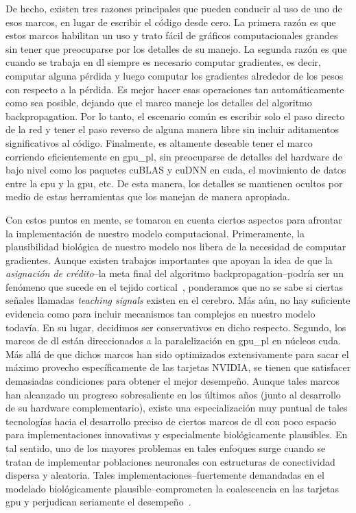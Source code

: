 {De hecho, existen tres razones principales que pueden conducir al uso de uno de esos marcos, en lugar de escribir el código desde cero.
La primera razón es que estos marcos habilitan un uso y trato fácil de gráficos computacionales grandes sin tener que preocuparse por los detalles de su manejo.
La segunda razón es que cuando se trabaja en \gls{dl} siempre es necesario computar gradientes, es decir, computar alguna pérdida y luego computar los gradientes alrededor de los pesos con respecto a la pérdida.
Es mejor hacer esas operaciones tan automáticamente como sea posible, dejando que el marco maneje los detalles del algoritmo backpropagation.
Por lo tanto, el escenario común es escribir solo el paso directo de la red y tener el paso reverso de alguna manera libre sin incluir aditamentos significativos al código.
Finalmente, es altamente deseable tener el marco corriendo eficientemente en  \gls{gpu_pl}, sin preocuparse de detalles del hardware de bajo nivel como los paquetes cuBLAS y cuDNN en \gls{cuda}, el movimiento de datos entre la \gls{cpu} y la \gls{gpu}, etc.
De esta manera, los detalles se mantienen ocultos por medio de estas herramientas que los manejan de manera apropiada.

Con estos puntos en mente, se tomaron en cuenta ciertos aspectos para afrontar la implementación de nuestro modelo computacional.
Primeramente, la plausibilidad biológica de  nuestro modelo nos libera de la necesidad de computar gradientes.
Aunque existen trabajos importantes que apoyan la idea de que la \emph{asignación de crédito}--la meta final del algoritmo backpropagation--podría ser un fenómeno que sucede en el tejido cortical~\cite{Guerguiev2017TowardsDL}, ponderamos que no se sabe si ciertas señales llamadas \emph{teaching signals} existen en el cerebro.
Más aún, no hay suficiente evidencia como para incluir mecanismos tan complejos en nuestro modelo todavía.
En su lugar, decidimos ser conservativos en dicho respecto.
Segundo, los marcos de \gls{dl} están direccionados a la paralelización en \gls{gpu_pl} en núcleos \gls{cuda}.
Más allá de que dichos marcos han sido optimizados extensivamente para sacar el máximo provecho específicamente de las tarjetas NVIDIA, se tienen que satisfacer demasiadas condiciones para obtener el mejor desempeño.
Aunque tales marcos han alcanzado un progreso sobresaliente en los últimos años (junto al desarrollo de su hardware complementario), existe una especialización muy puntual de tales tecnologías hacia el desarrollo preciso de ciertos marcos de \gls{dl} con poco espacio para implementaciones innovativas y especialmente biológicamente plausibles.
En tal sentido, uno de los mayores problemas en tales enfoques surge cuando se tratan de implementar poblaciones neuronales con estructuras de conectividad dispersa y aleatoria.
Tales implementaciones--fuertemente demandadas en el modelado biológicamente plausible--comprometen la coalescencia en las tarjetas \gls{gpu} y perjudican seriamente el desempeño~\cite{doi:10.3109/0954898X.2012.739292}.

}
